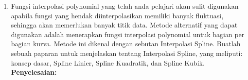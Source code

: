 \documentclass{article}
\newcommand{\penyelesaian}{\textbf{Penyelesaian: }}
\begin{document}
\begin{enumerate}
    \item Fungsi interpolasi polynomial yang telah anda pelajari akan sulit digunakan apabila fungsi yang hendak diinterpolasikan memiliki banyak fluktuasi, sehingga akan memerlukan banyak titik data.
    Metode alternatif yang dapat digunakan adalah menerapkan fungsi interpolasi polynomial untuk bagian per bagian kurva. 
    Metode ini dikenal dengan sebutan Interpolasi Spline. Buatlah sebuah paparan untuk menjelaskan tentang Interpolasi Spline, yang meliputi: konsep dasar, Spline Linier, Spline Kuadratik, dan Spline Kubik. \\
    \penyelesaian

\end{enumerate}
\end{document}
